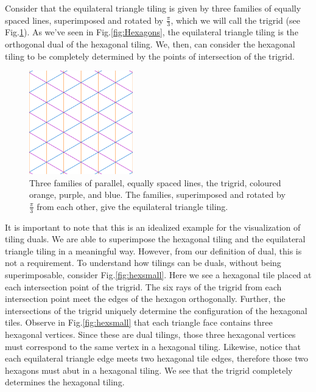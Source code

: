 \documentclass[
  oneside,
  11pt, a4paper,
  footinclude=true,
  headinclude=true,
  cleardoublepage=empty
]{scrbook}
\begin{document}
Consider that the equilateral triangle tiling is given by three families of equally spaced lines, superimposed and rotated by $\frac{\pi}{3}$, which we will call the trigrid (see Fig.\ref{fig:trifam}). As we've seen in Fig.\ref{fig:Hexagons}, the equilateral triangle tiling is the orthogonal dual of the hexagonal tiling. We, then, can consider the hexagonal tiling to be completely determined by the points of intersection of the trigrid. 

\begin{figure}[H]
\centering
\includegraphics[width=0.4\textwidth]{TriangleFamilies}
\caption[Trigrid]{Three families of parallel, equally spaced lines, the trigrid, coloured orange, purple, and blue. The families, superimposed and rotated by $\frac{\pi}{3}$ from each other, give the equilateral triangle tiling.}
\label{fig:trifam}
\end{figure}

It is important to note that this is an idealized example for the visualization of tiling duals. We are able to superimpose the hexagonal tiling and the equilateral triangle tiling in a meaningful way. However, from our definition of dual, this is not a requirement. To understand how tilings can be duals, without being superimposable, consider Fig.\ref{fig:hexsmall}. Here we see a hexagonal tile placed at each intersection point of the trigrid. The six rays of the trigrid from each intersection point meet the edges of the hexagon orthogonally. Further, the intersections of the trigrid uniquely determine the configuration of the hexagonal tiles. Observe in Fig.\ref{fig:hexsmall} that each triangle face contains three hexagonal vertices. Since these are dual tilings, those three hexagonal vertices must correspond to the same vertex in a hexagonal tiling. Likewise, notice that each equilateral triangle edge meets two hexagonal tile edges, therefore those two hexagons must abut in a hexagonal tiling.  We see that the trigrid completely determines the hexagonal tiling. 
\end{document}
